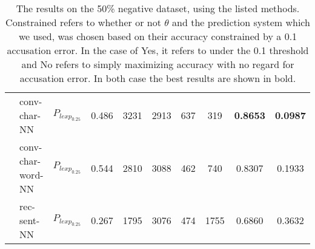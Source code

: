 \begin{table}[]
\begin{adjustbox}{center}
\begin{tabular}{|c|l|c|c|c|c|c|c|c|c|}
                     & \gls{conv-char-NN}      & $P_{lexp_{0.25}}$ & 0.486    & 3231 & 2913 & 637  & 319  & \textbf{0.8653} & \textbf{0.0987} \\ \cline{2-10} 
                     & \gls{conv-char-word-NN} & $P_{lexp_{0.25}}$ & 0.544    & 2810 & 3088 & 462  & 740  & 0.8307          & 0.1933          \\ \cline{2-10} 
                     & \gls{rec-sent-NN}       & $P_{lexp_{0.25}}$ & 0.267    & 1795 & 3076 & 474  & 1755 & 0.6860          & 0.3632          \\ \hline
\end{tabular}
\end{adjustbox}
\caption{The results on the 50\% negative dataset, using the listed methods.
Constrained refers to whether or not $\theta$ and the prediction system which we
used, was chosen based on their accuracy constrained by a 0.1 accusation error.
In the case of Yes, it refers to under the 0.1 threshold and No refers to simply
maximizing accuracy with no regard for accusation error. In both case
the best results are shown in bold.}
\label{tab:50_results}
\end{table}

